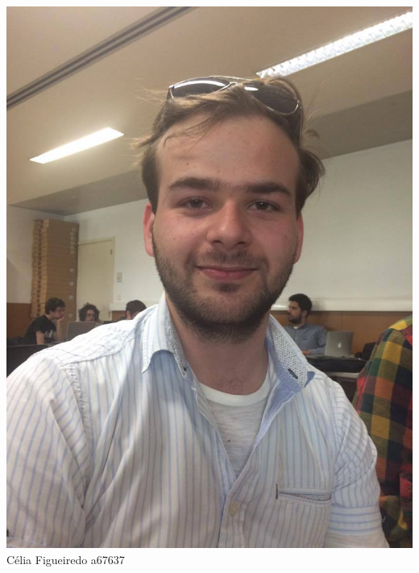 \begin{titlepage}
\begin{center}
\noindent\begin{minipage}[b]{.1\textwidth}
	\includegraphics[scale=0.1]{ricardo}
	\tiny{Célia Figueiredo a67637}
\end{minipage} 
\hfill
\begin{minipage}[b]{.1\textwidth}

\end{minipage}
\end{center}
\end{titlepage}
